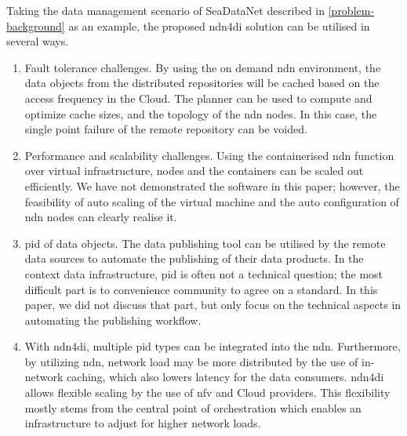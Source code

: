 \documentclass[conference]{IEEEtran}
\begin{document}
Taking the data management scenario of SeaDataNet described in \ref{problem-background} as an example, the proposed \gls{ndn4di} solution can be utilised in several ways. 
\begin{enumerate}
    \item Fault tolerance challenges. By using the on demand \gls{ndn} environment, the data objects from the distributed repositories will be cached based on the access frequency in the Cloud. The planner can be used to compute and optimize cache sizes, and the topology of the \gls{ndn} nodes. In this case, the single point failure of the remote repository can be voided.  
    \item Performance and scalability challenges. Using the containerised \gls{ndn} function over virtual infrastructure, nodes and the containers can be scaled out efficiently. We have not demonstrated the software in this paper; however, the feasibility of auto scaling of the virtual machine and the auto configuration of \gls{ndn} nodes can clearly realise it.  
    \item \gls{pid} of data objects. The data publishing tool can be utilised by the remote data sources to automate the publishing of their data products. In the context data infrastructure, \gls{pid} is often not a technical question; the most difficult part is to convenience community to agree on a standard. In this paper, we did not discuss that part, but only focus on the technical aspects in automating the publishing workflow. 
    \item With \gls{ndn4di}, multiple \gls{pid} types can be integrated into the \gls{ndn}. Furthermore, by utilizing \gls{ndn}, network load may be more distributed by the use of in-network caching, which also lowers latency for the data consumers. \gls{ndn4di} allows flexible scaling by the use of \gls{nfv} and Cloud providers. This flexibility mostly stems from the central point of orchestration which enables an infrastructure to adjust for higher network loads.
\end{enumerate}

\end{document}
